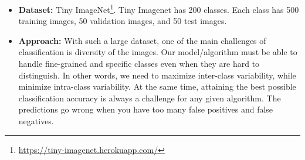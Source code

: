 \documentclass[8pt,a4]{article}
\begin{document}
\begin{itemize}
	\item \textbf{Dataset:} Tiny ImageNet\footnote{\url{https://tiny-imagenet.herokuapp.com/}}. Tiny Imagenet has 200 classes. Each class has 500 training images, 50 validation images, and 50 test images.
	
	\item \textbf{Approach:} With such a large dataset, one of the main challenges of classification is diversity of the images. Our model/algorithm must be able to handle fine-grained and specific classes even when they are hard to distinguish. In other words, we need to maximize inter-class variability, while minimize intra-class variability. At the same time, attaining the best possible classification accuracy is always a challenge for any given algorithm. The predictions go wrong when you have too many false positives and false negatives.
	

\end{itemize}
\end{document}
